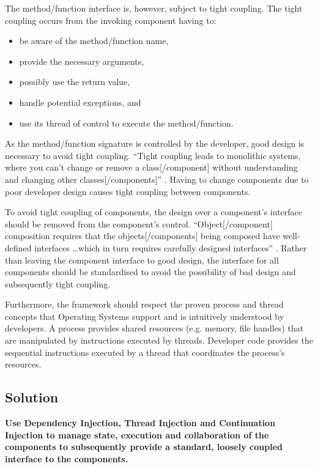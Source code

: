 \documentclass[prodmode]{style/acmlarge}
\begin{document}
The method/function interface is, however, subject to tight coupling.  The tight
coupling occurs from the invoking component having to:
\begin{itemize}
  \item be aware of the method/function name,
  \item provide the necessary arguments,
  \item possibly use the return value,
  \item handle potential exceptions, and
  \item use its thread of control to execute the method/function.
\end{itemize}

As the method/function signature is controlled by the developer, good design is
necessary to avoid tight coupling.  ``Tight coupling leads to monolithic
systems, where you can't change or remove a class[/component] without
understanding and changing other classes[/components]'' \cite[p. 24-25]{gof}.
Having to change components due to poor developer design causes tight coupling
between components.

To avoid tight coupling of components, the design over a component's
interface should be removed from the component's control. ``Object[/component]
composition requires that the objects[/components] being composed have
well-defined interfaces \ldots which in turn requires carefully designed
interfaces'' \cite[p. 19]{gof}.  Rather than leaving the component interface to
good design, the interface for all components should be standardised to avoid
the possibility of bad design and subsequently tight coupling.

Furthermore, the framework should respect the proven process and thread concepts
that Operating Systems support and is intuitively understood by developers.  A
process provides shared resources (e.g. memory, file handles) that are
manipulated by instructions executed by threads.  Developer code provides the
sequential instructions executed by a thread that coordinates the process's
resources.


\subsection{Solution}


\textbf{Use Dependency Injection, Thread Injection and Continuation Injection to manage state, execution and collaboration of the components to subsequently provide a standard, loosely coupled interface to the components.}
\end{document}
